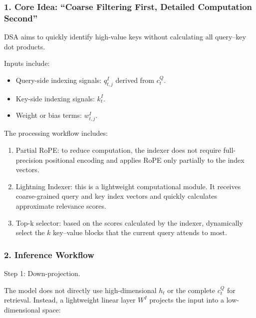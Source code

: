 \hypertarget{core-idea-coarse-filtering-first-detailed-computation-second}{%
\subsubsection{1. Core Idea: ``Coarse Filtering First, Detailed Computation Second''}\label{core-idea-coarse-filtering-first-detailed-computation-second}}

DSA aims to quickly identify high-value keys without calculating all query--key dot products.

Inputs include:

\begin{itemize}
\tightlist
\item
  Query-side indexing signals: \(q^I_{t,j}\) derived from \(c_t^Q\).
\item
  Key-side indexing signals: \(k_t^I\).
\item
  Weight or bias terms: \(w^I_{t,j}\).
\end{itemize}

The processing workflow includes:

\begin{enumerate}
\def\labelenumi{\arabic{enumi}.}
\tightlist
\item
  Partial RoPE: to reduce computation, the indexer does not require full-precision positional encoding and applies RoPE only partially to the index vectors.
\item
  Lightning Indexer: this is a lightweight computational module. It receives coarse-grained query and key index vectors and quickly calculates approximate relevance scores.
\item
  Top-k selector: based on the scores calculated by the indexer, dynamically select the \(k\) key--value blocks that the current query attends to most.
\end{enumerate}

\hypertarget{inference-workflow}{%
\subsubsection{2. Inference Workflow}\label{inference-workflow}}

Step 1: Down-projection.

The model does not directly use high-dimensional \(h_t\) or the complete \(c_t^Q\) for retrieval. Instead, a lightweight linear layer \(W^I\) projects the input into a low-dimensional space:

